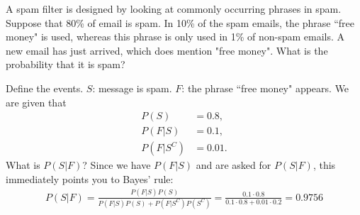 

\setcounter{theorem}{0}

\begin{exercise} [BH2.1]
A spam filter is designed by looking at commonly occurring phrases in spam. Suppose that 80\% of email is spam. In 10\% of the spam emails, the phrase ``free money" is used, whereas this phrase is only used in 1\% of non-spam emails. A new email has just arrived, which does mention "free money". What is the probability that it is spam?
\begin{solution}
	Define the events. $S$: message is spam. $F$: the phrase ``free money" appears. We are given that
	\begin{align*}
		P(S) &= 0.8,\\
		P(F|S) & = 0.1,\\
		P(F|S^{C}) & = 0.01.
	\end{align*}
	What is $P(S|F)$? Since we have $P(F|S)$ and are asked for $P(S|F)$, this immediately points you to Bayes' rule:
	\begin{align*}
		P(S|F) = \frac{P(F|S)P(S)}{P(F|S)P(S)+P(F|S^{C})P(S^{C})} = \frac{0.1\cdot 0.8}{0.1\cdot 0.8 + 0.01\cdot 0.2} = 0.9756
	\end{align*}
\end{solution}
\end{exercise}


